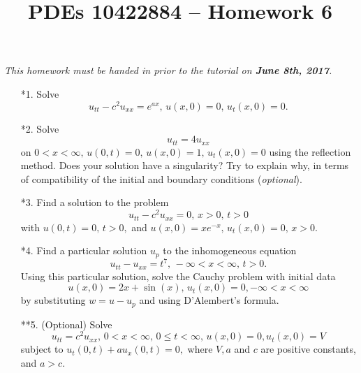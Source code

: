 \documentclass[10pt,a4paper]{article}
\title{PDEs 10422884 -- Homework 6}
\date{}
\begin{document}
\maketitle
\textsl{ This homework must be handed in prior to the tutorial on \textbf{June 8th, 2017}.}

\begin{enumerate}
\item[*1.] Solve %
\[ u_{tt} - c^2 u_{xx} = e^{ax}, \, u(x,0) = 0, \, u_t(x,0) = 0. \]
\item[*2.] Solve %
\[ u_{tt} = 4 u_{xx} \]
on $0<x<\infty, \, u(0,t) = 0, \, u(x,0) = 1, \, u_t(x,0) = 0$ using the reflection method. Does your solution have a singularity? Try to explain why, in terms of compatibility of the initial and boundary conditions (\emph{optional}).
\item[*3.] Find a solution to the problem %
\[ u_{tt} - c^2 u_{xx} = 0, \, x>0, \, t>0 \]
with $u(0,t) = 0, \, t>0,$ and $u(x,0) = xe^{-x}, \, u_t(x,0) = 0, \, x>0.$
\item[*4.] Find a particular solution $u_p$ to the inhomogeneous equation 
\[ u_{tt} - u_{xx} = t^7, \, -\infty < x < \infty, \, t>0. \]
Using this particular solution, solve the Cauchy problem with initial data 
\[ u(x,0) = 2x + \sin(x), \, u_t(x,0) = 0, -\infty<x < \infty \]
by substituting $w = u - u_p$ and using D'Alembert's formula. %
\item[**5.] (Optional) Solve 
\[ u_{tt} = c^2 u_{xx}, \, 0<x<\infty, \, 0 \leq t < \infty, \, u(x,0) = 0, u_t(x,0) = V\] subject to $u_t(0,t) + au_x(0,t) = 0,$ where $V, a$ and $c$ are positive constants, and $a > c.$ %
\end{enumerate}
\end{document}
